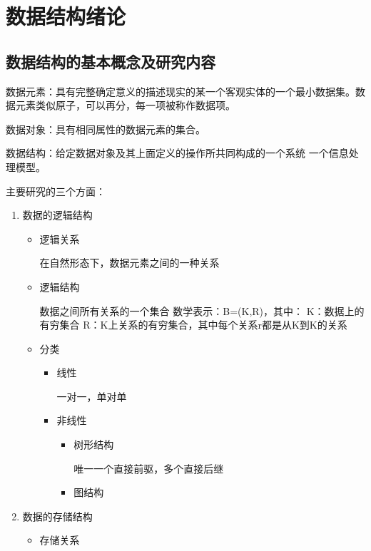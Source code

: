 \documentclass[AutoFakeBold]{LZUThesis2007}
\begin{document}
\chapter{数据结构绪论}

    \section{数据结构的基本概念及研究内容}

	数据元素：具有完整确定意义的描述现实的某一个客观实体的一个最小数据集。数据元素类似原子，可以再分，每一项被称作数据项。

	数据对象：具有相同属性的数据元素的集合。

	数据结构：给定数据对象及其上面定义的操作所共同构成的一个系统 一个信息处理模型。

	主要研究的三个方面：
\begin{enumerate}
	\item 数据的逻辑结构
		\begin{itemize}
		\item  逻辑关系
	
					在自然形态下，数据元素之间的一种关系
	
		\item  逻辑结构
	
					数据之间所有关系的一个集合
				数学表示：B=(K,R)，其中：
				K：数据上的有穷集合
				R：K上关系的有穷集合，其中每个关系r都是从K到K的关系
	
		\item  分类
	
			\begin{itemize}
				\item  线性
						
							一对一，单对单
		
				\item  非线性
				\begin{itemize}
					\item  树形结构
		
								唯一一个直接前驱，多个直接后继
		
					\item  图结构
				\end{itemize}
			\end{itemize}
		\end{itemize}

	\item 数据的存储结构
			\begin{itemize}
				\item  存储关系
	

\end{itemize}
\end{enumerate}
\end{document}
